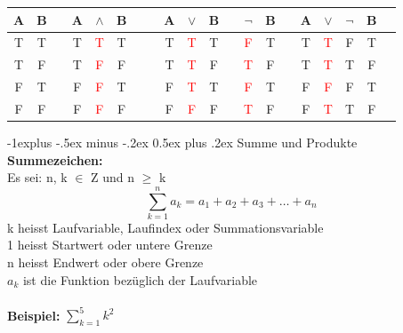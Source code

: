 \documentclass[a4paper,10pt]{article}
\makeatletter
\renewcommand{\subsection}{\@startsection{subsection}{2}{0mm}%
                                {-1explus -.5ex minus -.2ex}%
                                {0.5ex plus .2ex}%
                                {\normalfont\normalsize\bfseries}}
\makeatother
\begin{document}
\begin{multicols}{3}
    \begin{tabular}{@{ }c@{ }@{ }c | c@{ }@{ }c@{ }@{ }c@{ }@{ }c@{ }@{ }c | c@{ }@{ }c@{ }@{ }c@{ }@{ }c@{ }@{ }c | c@{ }@{ }c | c@{ }@{ }c@{ }@{ }c@{ }@{ }c@{ }@{ }c@{ }@{ }c}
        A & B &  & A & $\land$            & B &  &  & A & $\lor$             & B &  & $\lnot$            & B &  & A & $\lor$             & $\lnot$ & B & \\
        \hline
        T & T &  & T & \textcolor{red}{T} & T &  &  & T & \textcolor{red}{T} & T &  & \textcolor{red}{F} & T &  & T & \textcolor{red}{T} & F       & T & \\
        T & F &  & T & \textcolor{red}{F} & F &  &  & T & \textcolor{red}{T} & F &  & \textcolor{red}{T} & F &  & T & \textcolor{red}{T} & T       & F & \\
        F & T &  & F & \textcolor{red}{F} & T &  &  & F & \textcolor{red}{T} & T &  & \textcolor{red}{F} & T &  & F & \textcolor{red}{F} & F       & T & \\
        F & F &  & F & \textcolor{red}{F} & F &  &  & F & \textcolor{red}{F} & F &  & \textcolor{red}{T} & F &  & F & \textcolor{red}{T} & T       & F & \\
    \end{tabular}

    \subsection{Summe und Produkte}
    \textbf{Summezeichen:} \\
    Es sei:  n, k $\in$ Z und n $\geq$ k
    \[ \sum_{k=1}^{n} a_k = a_1 + a_2 + a_3 + \ldots + a_n \]
    k heisst Laufvariable, Laufindex oder Summationsvariable \\
    1 heisst Startwert oder untere Grenze \\
    n heisst Endwert oder obere Grenze \\
    $a_{k}$ ist die Funktion bezüglich der Laufvariable \\~\\
    \textbf{Beispiel:}
    $\sum_{k=1}^{5} k^2$


\end{multicols}
\end{document}
